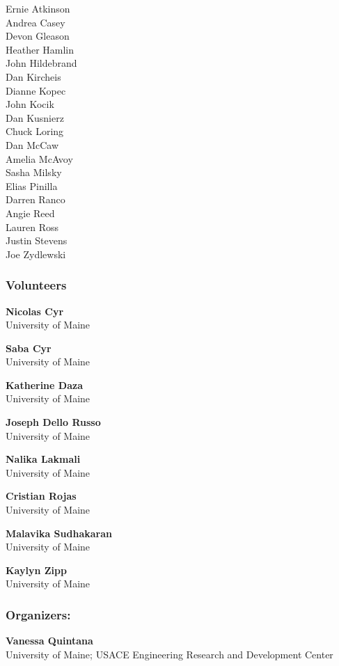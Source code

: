 \documentclass[
]{book}
\begin{document}
Ernie Atkinson\\
Andrea Casey\\
Devon Gleason\\
Heather Hamlin\\
John Hildebrand\\
Dan Kircheis\\
Dianne Kopec\\
John Kocik\\
Dan Kusnierz\\
Chuck Loring\\
Dan McCaw\\
Amelia McAvoy\\
Sasha Milsky\\
Elias Pinilla\\
Darren Ranco\\
Angie Reed\\
Lauren Ross\\
Justin Stevens\\
Joe Zydlewski

\subsubsection{Volunteers}\label{volunteers}

\textbf{Nicolas Cyr}\\
University of Maine

\textbf{Saba Cyr}\\
University of Maine

\textbf{Katherine Daza}\\
University of Maine

\textbf{Joseph Dello Russo}\\
University of Maine

\textbf{Nalika Lakmali}\\
University of Maine

\textbf{Cristian Rojas}\\
University of Maine

\textbf{Malavika Sudhakaran}\\
University of Maine

\textbf{Kaylyn Zipp}\\
University of Maine

\subsubsection{Organizers:}\label{organizers}

\textbf{Vanessa Quintana}\\
University of Maine; USACE Engineering Research and Development Center
\end{document}
